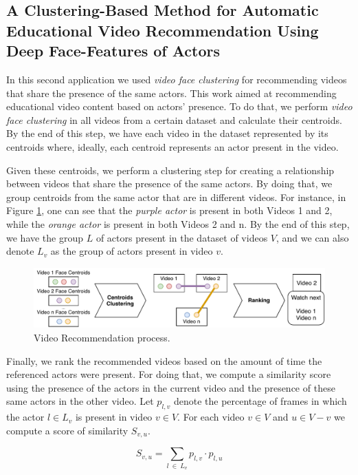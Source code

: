 \subsection{A Clustering-Based Method for Automatic Educational Video Recommendation Using Deep Face-Features of Actors}

In this second application we used \emph{video face clustering} for recommending videos that share the presence of the same actors. %
This work aimed at recommending educational video content based on actors' presence.
To do that, we perform \emph{video face clustering} in all videos from a certain dataset and calculate their centroids.
By the end of this step, we have each video in the dataset represented by its centroids where, ideally, each centroid represents an actor present in the video.


Given these centroids, we perform a clustering step for creating a relationship between videos that share the presence of the same actors.
By doing that, we group centroids from the same actor that are in different videos. For instance, in Figure \ref{fig:video_recommendation}, one can see that the \emph{purple actor} is present in both Videos 1 and 2, while the \emph{orange actor} is present in both Videos 2 and n. 
By the end of this step, we have the group $L$ of actors present in the dataset of videos $V$, and we can also denote $L_v$ as the group of actors present in video $v$.

\begin{figure}[!ht]
  \centering
  \includegraphics[width=0.8\linewidth]{img/ism/video_recommendation.pdf}
  \caption{Video Recommendation process.}
  \label{fig:video_recommendation}
\end{figure}

Finally, we rank the recommended videos based on the amount of time the referenced actors were present.
For doing that, we compute a similarity score using the presence of the actors in the current video and the presence of these same actors in the other video.
Let $p_{l,v}$ denote the percentage of frames in which the actor $l \in L_v$ is present in video $v \in V$. For each video $v \in V$ and $u \in V-v$ we compute a score of similarity $S_{v,u}$.

\vspace{-1em}
\begin{equation}
  S_{v,u} = \sum_{l~\in~L_v}{p_{l,v}\cdot{p_{l,u}}}
\end{equation}

